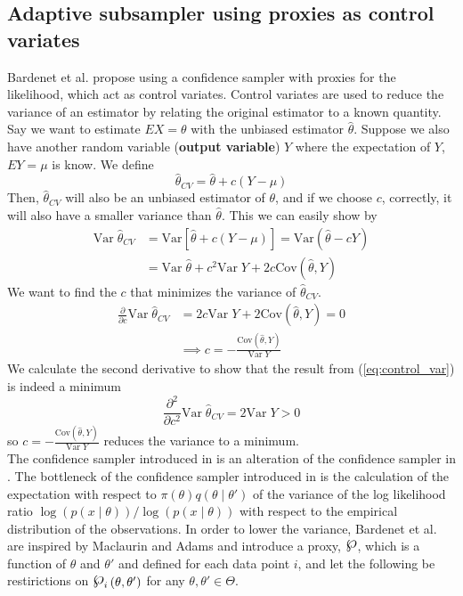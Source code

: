 \documentclass{article}
\theoremstyle{definition}
\newcommand{\powerset}{\raisebox{.15\baselineskip}{\Large\ensuremath{\wp}}}
\begin{document}
\subsection{Adaptive subsampler using proxies as control variates}
Bardenet et al. \cite{Bardenet:1} propose using a confidence sampler with proxies for the likelihood, which act as control variates. Control variates are used to reduce the variance of an estimator by relating the original estimator to a known quantity. Say we want to estimate $EX = \theta$ with the unbiased estimator $\hat{\theta}$. Suppose we also have another random variable (\textbf{output variable}) $Y$ where the expectation of $Y$, $EY = \mu$ is know. We define $$\hat{\theta}_{CV} = \hat{\theta} + c\left(Y - \mu\right) $$  Then, $\hat{\theta}_{CV}$ will also be  an unbiased estimator of $\theta$, and if we choose $c$, correctly, it will also have a smaller variance than $\hat{\theta}$. This we can easily show by \begin{equation*}
\begin{split}
    \mathrm{Var}\;\hat{\theta}_{CV}  &= \mathrm{Var}\left[\hat{\theta} + c\left(Y - \mu\right)\right]
     = \mathrm{Var}\left(\hat{\theta} - cY\right) \\ & = \mathrm{Var}\;\hat{\theta} + c^2\mathrm{Var}\;Y + 2c\mathrm{Cov}\left(\hat{\theta}, Y\right)
\end{split}
\end{equation*}
We want to find the $c$ that minimizes the variance of $\hat{\theta}_{CV}$. 
\begin{equation}\label{eq:control_var}
\begin{split}
    \frac{\partial}{\partial c} \mathrm{Var}\; \hat{\theta}_{CV} &= 2c\mathrm{Var}\;Y + 2\mathrm{Cov}\left(\hat{\theta}, Y\right) = 0 \\
    & \implies c = - \frac{\mathrm{Cov}\left(\hat{\theta}, Y\right)}{\mathrm{Var}\;Y}
\end{split}
\end{equation}
We calculate the second derivative to show that the result from (\ref{eq:control_var}) is indeed a minimum
\begin{equation*}
    \frac{\partial^2}{\partial c^2} \mathrm{Var}\; \hat{\theta}_{CV}  = 2\mathrm{Var}\; Y > 0 
\end{equation*}
so $c = -\frac{\mathrm{Cov}\left(\hat{\theta}, Y\right)}{\mathrm{Var}\;Y}$ reduces the variance to a minimum. \\
The confidence sampler introduced in \cite{Bardenet:1} is an alteration of the confidence sampler in \cite{Bardenet:2}. The bottleneck of the confidence sampler introduced in \cite{Bardenet:2} is the calculation of the expectation with respect to $\pi\left(\theta\right)q\left(\theta \mid \theta'\right)$ of the variance of the log likelihood ratio $\log \left(p\left(x\mid \theta\right)\right) / \log \left(p\left(x\mid \theta\right)\right)$ with respect to the empirical distribution of the observations. In order to lower the variance, Bardenet et al. are inspired by Maclaurin and Adams and introduce a proxy, $\powerset$, which is a function of $\theta$ and $\theta'$ and defined for each data point $i$, and let the following be restirictions on $\powerset_i\left(\theta, \theta'\right)$ for any $\theta, \theta' \in \Theta$. 
\end{document}
